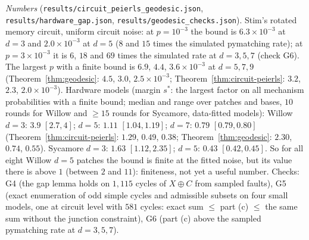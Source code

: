 \noindent\emph{Numbers} (\texttt{results/circuit\_peierls\_geodesic.json}, \texttt{results/hardware\_gap.json}, \texttt{results/geodesic\_checks.json}). Stim's rotated memory circuit, uniform circuit noise: at $p=10^{-3}$ the bound is $6.3\times10^{-3}$ at $d=3$ and $2.0\times10^{-3}$ at $d=5$ ($8$ and $15$ times the simulated pymatching rate); at $p=3\times10^{-3}$ it is $6$, $18$ and $69$ times the simulated rate at $d=3,5,7$ (check G6). The largest $p$ with a finite bound is $6.9$, $4.4$, $3.6\times10^{-3}$ at $d=5,7,9$ (Theorem~\ref{thm:geodesic}: $4.5$, $3.0$, $2.5\times10^{-3}$; Theorem~\ref{thm:circuit-peierls}: $3.2$, $2.3$, $2.0\times10^{-3}$).
Hardware models (margin $s^\ast$: the largest factor on all mechanism probabilities with a finite bound; median and range over patches and bases, $10$ rounds for Willow and $\ge15$ rounds for Sycamore, data-fitted models):
Willow $d=3$: $3.9$ $[2.7,4]$; $d=5$: $1.11$ $[1.04,1.19]$; $d=7$: $0.79$ $[0.79,0.80]$ (Theorem~\ref{thm:circuit-peierls}: $1.29$, $0.49$, $0.38$; Theorem~\ref{thm:geodesic}: $2.30$, $0.74$, $0.55$). Sycamore $d=3$: $1.63$ $[1.12,2.35]$; $d=5$: $0.43$ $[0.42,0.45]$.
So for all eight Willow $d=5$ patches the bound is finite at the fitted noise, but its value there is above $1$ (between $2$ and $11$): finiteness, not yet a useful number. Checks: G4 (the gap lemma holds on $1{,}115$ cycles of $X\oplus C$ from sampled faults), G5 (exact enumeration of odd simple cycles and admissible subsets on four small models, one at circuit level with $581$ cycles: exact sum $\le$ part (c) $\le$ the same sum without the junction constraint), G6 (part (c) above the sampled pymatching rate at $d=3,5,7$).

